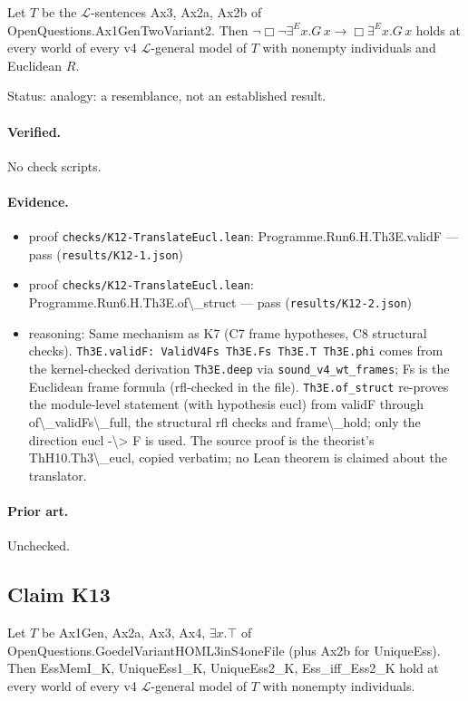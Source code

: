 \documentclass{article}
\begin{document}
Let $T$ be the $\mathcal L$-sentences Ax3, Ax2a, Ax2b of OpenQuestions.Ax1GenTwoVariant2. Then $\neg\Box\neg\exists^E x.G\,x\to\Box\exists^E x.G\,x$ holds at every world of every v4 $\mathcal L$-general model of $T$ with nonempty individuals and Euclidean $R$.

Status: analogy: a resemblance, not an established result.

\paragraph{Verified.}
No check scripts.

\paragraph{Evidence.}
\begin{itemize}
\item proof \texttt{checks/K12-TranslateEucl.lean}: Programme.Run6.H.Th3E.validF --- pass (\texttt{results/K12-1.json})
\item proof \texttt{checks/K12-TranslateEucl.lean}: Programme.Run6.H.Th3E.of\textbackslash{}\_struct --- pass (\texttt{results/K12-2.json})
\item reasoning: Same mechanism as K7 (C7 frame hypotheses, C8 structural checks). \texttt{Th3E.validF: ValidV4Fs Th3E.Fs Th3E.T Th3E.phi} comes from the kernel-checked derivation \texttt{Th3E.deep} via \texttt{sound\_v4\_wt\_frames}; Fs is the Euclidean frame formula (rfl-checked in the file). \texttt{Th3E.of\_struct} re-proves the module-level statement (with hypothesis eucl) from validF through of\textbackslash{}\_validFs\textbackslash{}\_full, the structural rfl checks and frame\textbackslash{}\_hold; only the direction eucl -\textbackslash{}\textgreater{} F is used. The source proof is the theorist's ThH10.Th3\textbackslash{}\_eucl, copied verbatim; no Lean theorem is claimed about the translator.
\end{itemize}

\paragraph{Prior art.} Unchecked.

\subsection*{Claim K13}

Let $T$ be Ax1Gen, Ax2a, Ax3, Ax4, $\exists x.\top$ of OpenQuestions.GoedelVariantHOML3inS4oneFile (plus Ax2b for UniqueEss). Then EssMemI\_K, UniqueEss1\_K, UniqueEss2\_K, Ess\_iff\_Ess2\_K hold at every world of every v4 $\mathcal L$-general model of $T$ with nonempty individuals.
\end{document}
